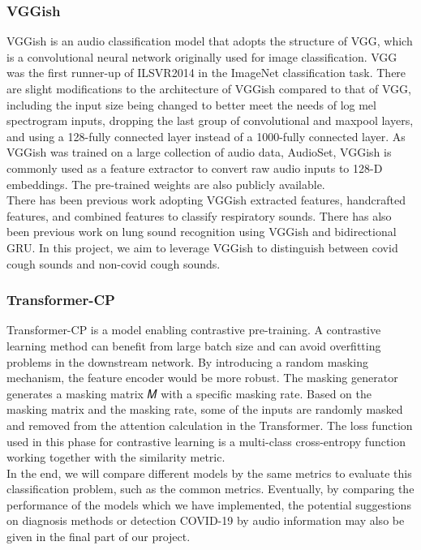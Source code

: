 \documentclass[11pt]{article}
\begin{document}
\subsubsection{VGGish}
VGGish\cite{Chao1st} is an audio classification model that adopts the structure of VGG\cite{Chao2nd}, which is a 
convolutional neural network originally used for image classification. VGG was the first runner-up of 
ILSVR2014 in the ImageNet classification task. There are slight modifications to the architecture of 
VGGish compared to that of VGG, including the input size being changed to better meet the needs of 
log mel spectrogram inputs, dropping the last group of convolutional and maxpool layers, and using 
a 128-fully connected layer instead of a 1000-fully connected layer. As VGGish was trained on a large 
collection of audio data, AudioSet\cite{Chao3rd}, VGGish is commonly used as a feature extractor to convert 
raw audio inputs to 128-D embeddings. The pre-trained weights are also publicly available. \\
 
\noindent
There has been previous work adopting VGGish extracted features, handcrafted features, and combined
 features to classify respiratory sounds\cite{Chao1st}. There has also been previous work on lung sound 
 recognition using VGGish and bidirectional GRU\cite{Chao5th}. In this project, we aim to leverage VGGish to 
 distinguish between covid cough sounds and non-covid cough sounds. 

\subsubsection{Transformer-CP}
Transformer-CP is a model enabling contrastive pre-training. A contrastive learning method can 
benefit from large batch size and can avoid overfitting problems in the downstream network. By 
introducing a random masking mechanism, the feature encoder would be more robust. The masking 
generator generates a masking matrix 𝑀 with a specific masking rate. Based on the masking matrix 
and the masking rate, some of the inputs are randomly masked and removed from the attention calculation 
in the Transformer. The loss function used in this phase for contrastive learning is a multi-class 
cross-entropy function working together with the similarity metric.\\

\noindent
In the end, we will compare different models by the same metrics to evaluate this classification 
problem, such as the common metrics\cite{hossin2015review}. Eventually, by comparing the performance of the models which
 we have implemented, the potential suggestions on diagnosis methods or detection COVID-19 by audio 
 information may also be given in the final part of our project.


\newpage

\end{document}
